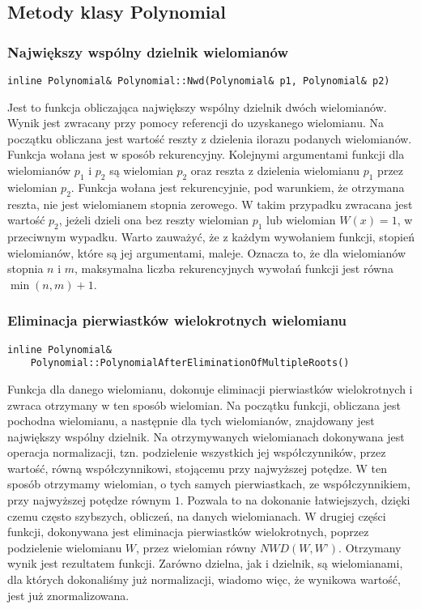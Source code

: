 \documentclass[twoside,a4paper]{book}
\begin{document}
\subsection{Metody klasy Polynomial}

\subsubsection{Największy wspólny dzielnik wielomianów}
\begin{lstlisting}
inline Polynomial& Polynomial::Nwd(Polynomial& p1, Polynomial& p2)
\end{lstlisting}

Jest to funkcja obliczająca największy wspólny dzielnik dwóch wielomianów. Wynik jest zwracany przy pomocy referencji do uzyskanego wielomianu. Na początku obliczana jest wartość reszty z dzielenia ilorazu podanych wielomianów. Funkcja wołana jest w sposób rekurencyjny. Kolejnymi argumentami funkcji dla wielomianów $p_1$ i $p_2$ są wielomian $p_2$ oraz reszta z dzielenia wielomianu $p_1$ przez wielomian $p_2$. Funkcja wołana jest rekurencyjnie, pod warunkiem, że otrzymana reszta, nie jest wielomianem stopnia zerowego. W takim przypadku zwracana jest wartość $p_2$, jeżeli dzieli ona bez reszty wielomian $p_1$ lub wielomian $W(x)=1$, w przeciwnym wypadku. Warto zauważyć, że z każdym wywołaniem funkcji, stopień wielomianów, które są jej argumentami, maleje. Oznacza to, że dla wielomianów stopnia $n$ i $m$, maksymalna liczba rekurencyjnych wywołań funkcji jest równa $\min(n,m)+1$.
\\

\subsubsection{Eliminacja pierwiastków wielokrotnych wielomianu}
\begin{lstlisting}
inline Polynomial&
	Polynomial::PolynomialAfterEliminationOfMultipleRoots()
\end{lstlisting}

Funkcja dla danego wielomianu, dokonuje eliminacji pierwiastków wielokrotnych i zwraca otrzymany w ten sposób wielomian. Na początku funkcji, obliczana jest pochodna wielomianu, a następnie dla tych wielomianów, znajdowany jest największy wspólny dzielnik. Na otrzymywanych wielomianach dokonywana jest operacja normalizacji, tzn. podzielenie wszystkich jej współczynników, przez wartość, równą współczynnikowi, stojącemu przy najwyższej potędze. W ten sposób otrzymamy wielomian, o tych samych pierwiastkach, ze współczynnikiem, przy najwyższej potędze równym $1$. Pozwala to na dokonanie łatwiejszych, dzięki czemu często szybszych, obliczeń, na danych wielomianach. W drugiej części funkcji, dokonywana jest eliminacja pierwiastków wielokrotnych, poprzez podzielenie wielomianu $W$, przez wielomian równy $NWD(W, W’)$. Otrzymany wynik jest rezultatem funkcji. Zarówno dzielna, jak i dzielnik, są wielomianami, dla których dokonaliśmy już normalizacji, wiadomo więc, że wynikowa wartość, jest już znormalizowana.
\\
\end{document}
